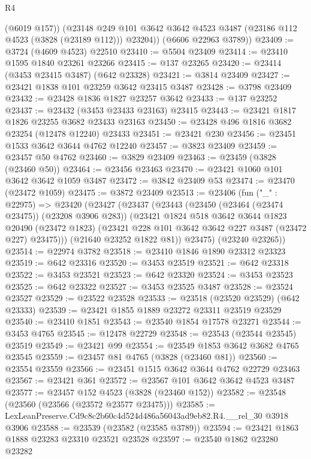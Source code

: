 \begin{lexlean}{R4}
\begin{coremodule}
          (@6019 @157))
        (@23148 @249 @101 @3642 @3642 @4523 @3487 (@23186 @112 @4523 (@3828 (@23189 @112))) @23204))
      (@6606 @22963 @3789))
@23409 := @3724 (@4609 @4523) @22510
@23410 := @5504 @23409
@23414 := @23410 @1595 @1840 @23261 @23266
@23415 := @137 @23265
@23420 := @23414 (@3453 @23415 @3487) (@642 @23328)
@23421 := @3814 @23409
@23427 := @23421 @1838 @101 @23259 @3642 @23415 @3487
@23428 := @3798 @23409
@23432 := @23428 @1836 @1827 @23257 @3642
@23433 := @137 @23252
@23437 := @23432 (@3453 @23433 @23163) @23415
@23443 := @23421 @1817 @1826 @23255 @3682 @23433 @23163
@23450 := @23428 @496 @1816 @3682 @23254 (@12478 @12240) @23433
@23451 := @23421 @230
@23456 := @23451 @1533 @3642 @3644 @4762 @12240
@23457 := @3823 @23409
@23459 := @23457 @50 @4762
@23460 := @3829 @23409
@23463 := @23459 (@3828 (@23460 @50))
@23464 := @23456 @23463
@23470 := @23421 @1060 @101 @3642 @3642 @1059 @3487
@23472 := @3842 @23409 @53
@23474 := @23470 (@23472 @1059)
@23475 := @3872 @23409
@23513 := @23406
    (fun ("_" : @22975) =>
    @23420
      (@23427
        (@23437
          (@23443
            (@23450 (@23464 (@23474 @23475)) (@23208 @3906 @283))
            (@23421
              @1824
              @518
              @3642
              @3644
              @1823
              @20490
              (@23472 @1823)
              (@23421 @228 @101 @3642 @3642 @227 @3487 (@23472 @227) @23475)))
          (@21640 @23252 @1822 @81))
        @23475)
      (@23240 @23265))
@23514 := @22974 @3782
@23518 := @23410 @1846 @1890 @23312 @23323
@23519 := @642 @23316
@23520 := @3453 @23519
@23521 := @642 @23318
@23522 := @3453 @23521
@23523 := @642 @23320
@23524 := @3453 @23523
@23525 := @642 @23322
@23527 := @3453 @23525 @3487
@23528 := @23524 @23527
@23529 := @23522 @23528
@23533 := @23518 (@23520 @23529) (@642 @23333)
@23539 := @23421 @1855 @1889 @23272 @23311 @23519 @23529
@23540 := @23410 @1851
@23543 := @23540 @1854 @17578 @23271
@23544 := @3453 @4765
@23545 := @12478 @22729
@23548 := @23543 (@23544 @23545) @23519
@23549 := @23421 @99
@23554 := @23549 @1853 @3642 @3682 @4765 @23545
@23559 := @23457 @81 @4765 (@3828 (@23460 @81))
@23560 := @23554 @23559
@23566 := @23451 @1515 @3642 @3644 @4762 @22729 @23463
@23567 := @23421 @361
@23572 := @23567 @101 @3642 @3642 @4523 @3487
@23577 := @23457 @152 @4523 (@3828 (@23460 @152))
@23582 := @23548 (@23560 (@23566 (@23572 @23577 @23475)))
@23585 := LexLeanPreserve.Cd9c8c2b60c4d524d486a56043ad9eb82.R4.__rel_30 @3918 @3906
@23588 := @23539 (@23582 (@23585 @3789))
@23594 := @23421 @1863 @1888 @23283 @23310 @23521 @23528
@23597 := @23540 @1862 @23280 @23282

\end{coremodule}
\end{lexlean}
